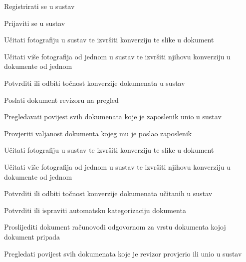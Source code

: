 			
			\begin{packed_enum}
				
				\item  {}
				\begin{packed_enum}
					
					\item Registrirati se u sustav
					
				\end{packed_enum}
			
				\item  {}
				
				\begin{packed_enum}
					
					\item Prijaviti se u sustav
					\item Učitati fotografiju u sustav te izvršiti konverziju te slike u dokument
					\item Učitati više fotografija od jednom u sustav te izvršiti njihovu konverziju u dokumente od jednom	
					\item Potvrditi ili odbiti točnost konverzije dokumenata u sustav
					\item Poslati dokument revizoru na pregled
					\item Pregledavati povijest svih dokumenata koje je zaposlenik unio u sustav
					
				\end{packed_enum}
			
				\item  {}
				
				\begin{packed_enum}

					\item Provjeriti valjanost dokumenta kojeg mu je poslao zaposlenik
					\item Učitati fotografiju u sustav te izvršiti konverziju te slike u dokument 
					\item Učitati više fotografija od jednom u sustav te izvršiti njihovu konverziju u dokumente od jednom
					\item Potvrditi ili odbiti točnost konverzije dokumenata učitanih u sustav
					\item Potvrditi ili ispraviti automatsku kategorizaciju dokumenta
					\item Proslijediti dokument računovođi odgovornom za vrstu dokumenta kojoj dokument pripada
					\item Pregledati povijest svih dokumenata koje je revizor provjerio ili unio u sustav
					

\end{packed_enum}
\end{packed_enum}
